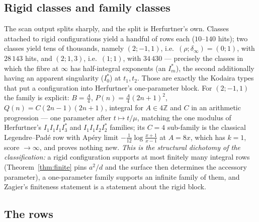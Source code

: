\documentclass[11pt,reqno]{amsart}
\theoremstyle{plain}
\theoremstyle{definition}
\theoremstyle{remark}
\theoremstyle{plain}
\newcommand{\Z}{\mathbb{Z}}
\begin{document}
\subsection{Rigid classes and family classes}
The scan output splits sharply, and the split is Herfurtner's own. Classes
attached to rigid configurations yield a handful of rows each ($10$--$140$ hits);
two classes yield tens of thousands, namely $(2;-1,1)$, i.e.\
$(\rho;\delta_\infty)=(0;1)$, with $28\,143$ hits, and $(2;1,3)$, i.e.\ $(1;1)$,
with $34\,430$ --- precisely the classes in which the fibre at $\infty$ has
half-integral exponents (an $I_m^*$), the second additionally having an apparent
singularity ($I_0^*$) at $t_1,t_2$. Those are exactly the Kodaira types that put
a configuration into Herfurtner's one-parameter block. For $(2;-1,1)$ the family
is explicit: $B=\tfrac A4$, $P(n)=\tfrac A4(2n+1)^2$, $Q(n)=C(2n-1)(2n+1)$,
integral for $A\in4\Z$ and $C$ in an arithmetic progression --- one parameter after
$t\mapsto t/\mu$, matching the one modulus of Herfurtner's $I_1I_1I_1I_3^*$ and
$I_1I_1I_2I_2^*$ families; its $C=4$ sub-family is the classical Legendre--Pad\'e
row with Ap\'ery limit $-\tfrac1{12}\log\frac{x+1}{x-1}$ at $A=8x$, which has
$k=1$, score $\to\infty$, and proves nothing new. \emph{This is the structural
dichotomy of the classification:} a rigid configuration supports at most finitely
many integral rows (Theorem~\ref{thm:finite} pins $a^2/d$ and the surface then
determines the accessory parameter), a one-parameter family supports an infinite
family of them, and Zagier's finiteness statement is a statement about the rigid
block.

\subsection{The rows}
\end{document}

